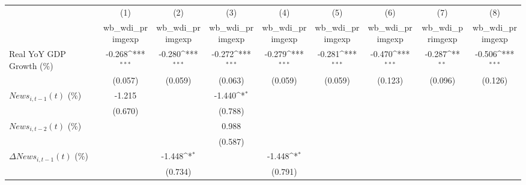 {
\def\sym#1{\ifmmode^{#1}\else\(^{#1}\)\fi}
\begin{tabular}{l*{8}{c}}
\toprule
                    &\multicolumn{1}{c}{(1)}&\multicolumn{1}{c}{(2)}&\multicolumn{1}{c}{(3)}&\multicolumn{1}{c}{(4)}&\multicolumn{1}{c}{(5)}&\multicolumn{1}{c}{(6)}&\multicolumn{1}{c}{(7)}&\multicolumn{1}{c}{(8)}\\
                    &\multicolumn{1}{c}{wb_wdi_primgexp}&\multicolumn{1}{c}{wb_wdi_primgexp}&\multicolumn{1}{c}{wb_wdi_primgexp}&\multicolumn{1}{c}{wb_wdi_primgexp}&\multicolumn{1}{c}{wb_wdi_primgexp}&\multicolumn{1}{c}{wb_wdi_primgexp}&\multicolumn{1}{c}{wb_wdi_primgexp}&\multicolumn{1}{c}{wb_wdi_primgexp}\\
\midrule
Real YoY GDP Growth (\%)&      -0.268\sym{***}&      -0.280\sym{***}&      -0.272\sym{***}&      -0.279\sym{***}&      -0.281\sym{***}&      -0.470\sym{***}&      -0.287\sym{**} &      -0.506\sym{***}\\
                    &     (0.057)         &     (0.059)         &     (0.063)         &     (0.059)         &     (0.059)         &     (0.123)         &     (0.096)         &     (0.126)         \\
\addlinespace
$ News_{i,t-1}(t)$ (\%)&      -1.215         &                     &      -1.440\sym{*}  &                     &                     &                     &                     &                     \\
                    &     (0.670)         &                     &     (0.788)         &                     &                     &                     &                     &                     \\
\addlinespace
$ News_{i,t-2}(t)$ (\%)&                     &                     &       0.988         &                     &                     &                     &                     &                     \\
                    &                     &                     &     (0.587)         &                     &                     &                     &                     &                     \\
\addlinespace
$ \Delta News_{i,t-1}(t)$ (\%)&                     &      -1.448\sym{*}  &                     &      -1.448\sym{*}  &                     &                     &                     &                     \\
                    &                     &     (0.734)         &                     &     (0.791)         &                     &                     &                     &                     \\

\end{tabular}}
